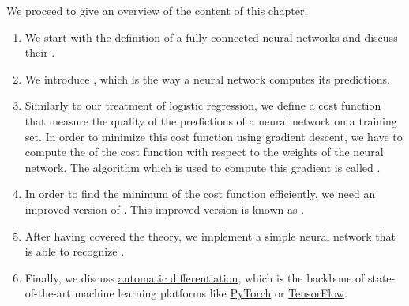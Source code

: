 We proceed to give an overview of the content of this chapter.
\begin{enumerate}
\item We start with the definition of a fully connected  neural networks and discuss their
  . 
\item We introduce , which is the way a neural network computes its predictions.
\item Similarly to our treatment of logistic regression, we define a cost function that measure the quality of
      the predictions of a neural network on a training set.  In order to minimize this cost function using
      gradient descent, we have to compute the  of the cost function with respect to the weights of the
      neural network.  The algorithm which is used to compute this gradient is called .
\item In order to find the minimum of the cost function efficiently, we need an improved version of
      .  This improved version is known as .
\item After having covered the theory, we implement a simple neural network that is able to recognize
      .
\item Finally, we discuss \href{https://en.wikipedia.org/wiki/Automatic_differentiation}{automatic
      differentiation}, which is the backbone of state-of-the-art machine learning platforms like
      \href{https://pytorch.org/}{PyTorch} or \href{https://www.tensorflow.org/}{TensorFlow}.
\end{enumerate}

